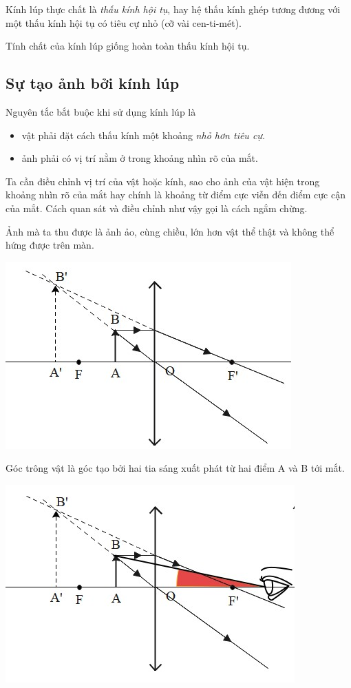 Kính lúp thực chất là \textit{thấu kính hội tụ}, hay hệ thấu kính ghép tương đương với một thấu kính hội tụ có tiêu cự nhỏ (cỡ vài cen-ti-mét).

Tính chất của kính lúp giống hoàn toàn thấu kính hội tụ. 

\subsection{Sự tạo ảnh bởi kính lúp}
Nguyên tắc bắt buộc khi sử dụng kính lúp là  
\begin{itemize}
	\item vật phải đặt cách thấu kính một khoảng \textit{nhỏ hơn tiêu cự.}
	\item ảnh phải có vị trí nằm ở trong khoảng nhìn rõ của mắt.
\end{itemize}

Ta cần điều chỉnh vị trí của vật hoặc kính, sao cho ảnh của vật hiện trong khoảng nhìn rõ của mắt hay chính là khoảng từ điểm cực viễn đến điểm cực cận của mắt. Cách quan sát và điều chỉnh như vậy gọi là cách ngắm chừng.

Ảnh mà ta thu được là ảnh ảo, cùng chiều, lớn hơn vật thể thật và không thể hứng được trên màn.
\begin{center}
	\includegraphics[scale=0.8]{../figs/VN11-PH-41-L-029-1-h43.jpg}
\end{center}

Góc trông vật là góc tạo bởi hai tia sáng xuất phát từ hai điểm A và B tới mắt.
\begin{center}
	\includegraphics[scale=0.8]{../figs/VN11-PH-41-L-029-1-h44.jpg}
\end{center}



